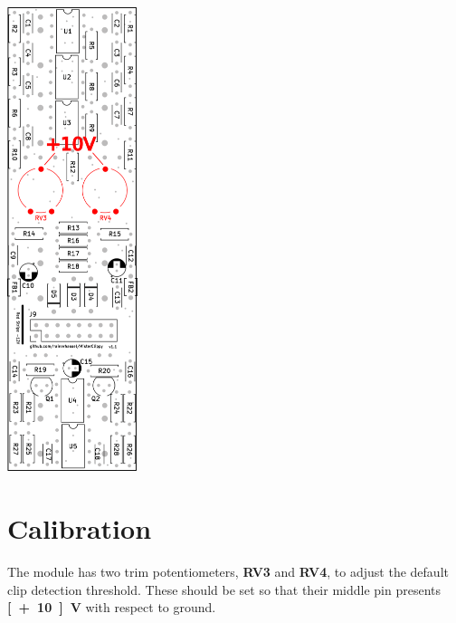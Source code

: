 \documentclass[a4paper,
               11pt,
               parskip=half,
               headinclude,
               titlepage=false]{scrartcl}
\begin{document}
\begin{minipage}[]{4cm}
\vspace{-2cm}
\includegraphics[width=3.8cm, trim={0 5.5cm 0 2.5cm}, clip]{MisterClippy-calibration}
\end{minipage}
\hspace{0.5cm}
\begin{minipage}[b]{10.5cm}
\setlength{\parskip}{\medskipamount}


\section*{Calibration}

The module has two trim potentiometers, \textbf{\color{red}RV3} and \textbf{\color{red}RV4}, to adjust the default clip detection threshold.
These should be set so that their middle pin presents \textbf{\unit[+10]{V}} with respect to ground.

\end{minipage}
\end{document}

